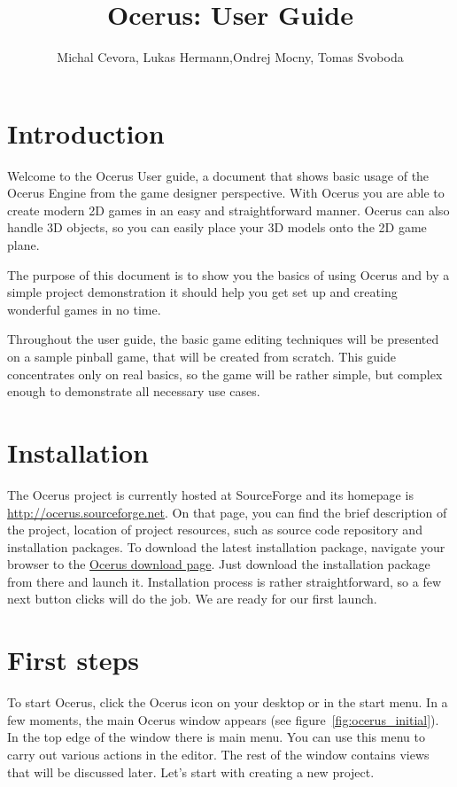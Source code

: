 \documentclass[a4paper,12pt]{article}
\title{Ocerus: User Guide}
\author{Michal Cevora, Lukas Hermann,Ondrej Mocny, Tomas Svoboda}
\date{}
\begin{document}
\maketitle

\tableofcontents

\section{Introduction}

Welcome to the Ocerus User guide, a document that shows basic usage of the Ocerus Engine from the game designer perspective. With Ocerus you are able to create modern 2D games in an easy and straightforward manner. Ocerus can also handle 3D objects, so you can easily place your 3D models onto the 2D game plane.


The purpose of this document is to show you the basics of using Ocerus and by a simple project demonstration it should help you get set up and creating wonderful games in no time. 

Throughout the user guide, the basic game editing techniques will be presented on a sample pinball game, that will be created from scratch. This guide concentrates only on real basics, so the game will be rather simple, but complex enough to demonstrate all necessary use cases.

\section{Installation}
The Ocerus project is currently hosted at SourceForge and its homepage is \url{http://ocerus.sourceforge.net}. On that page, you can find the brief description of the project, location of project resources, such as source code repository and installation packages. To download the latest installation package, navigate your browser to the \href{http://sourceforge.net/projects/ocerus/files/}{Ocerus download page}. Just download the installation package from there and launch it. Installation process is rather straightforward, so a few next button clicks will do the job. We are ready for our first launch.

\section{First steps}
To start Ocerus, click the Ocerus icon on your desktop or in the start menu. In a few moments, the main Ocerus window appears (see figure~\ref{fig:ocerus_initial}). In the top edge of the window there is main menu. You can use this menu to carry out various actions in the editor. The rest of the window contains views that will be discussed later. Let's start with creating a new project.
\end{document}
